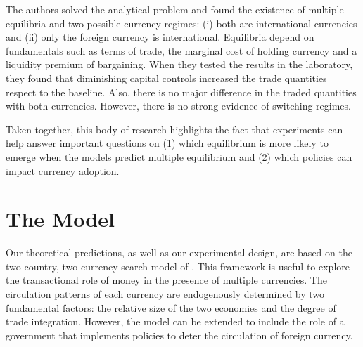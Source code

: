 The authors solved the analytical problem and found the existence of multiple equilibria and two possible currency regimes: (i) both are international currencies and (ii) only the foreign currency is international.  Equilibria depend on fundamentals such as terms of trade, the marginal cost of holding currency and a liquidity premium of bargaining. When they tested the results in the laboratory, they found that diminishing capital controls increased the trade quantities respect to the baseline. Also, there is no major difference in the traded quantities with both currencies. However, there is no strong evidence of switching regimes. 



Taken together, this body of research highlights the fact that experiments can help answer important questions on (1) which equilibrium is more likely to emerge when the models predict multiple equilibrium and (2) which policies can impact currency adoption. 

\section{The Model \label{Theoretical}}

Our theoretical predictions, as well as our experimental design, are based on the two-country, two-currency search model of \cite{MKM}. This framework is useful to explore the transactional role of money in the presence of multiple currencies. The circulation patterns of each currency are endogenously determined by two fundamental factors: the relative size of the two economies and the degree of trade integration. However, the model can be extended to include the role of a government that implements policies to deter the circulation of foreign currency. 

